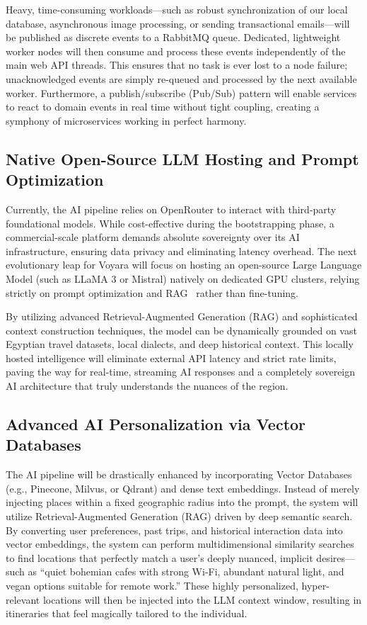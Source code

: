 Heavy, time-consuming workloads---such as robust synchronization of our local database, asynchronous image processing, or sending transactional emails---will be published as discrete events to a RabbitMQ queue. Dedicated, lightweight worker nodes will then consume and process these events independently of the main web API threads. This ensures that no task is ever lost to a node failure; unacknowledged events are simply re-queued and processed by the next available worker. Furthermore, a publish/subscribe (Pub/Sub) pattern will enable services to react to domain events in real time without tight coupling, creating a symphony of microservices working in perfect harmony.

\subsection{Native Open-Source LLM Hosting and Prompt Optimization}
Currently, the AI pipeline relies on OpenRouter to interact with third-party foundational models. While cost-effective during the bootstrapping phase, a commercial-scale platform demands absolute sovereignty over its AI infrastructure, ensuring data privacy and eliminating latency overhead. The next evolutionary leap for Voyara will focus on hosting an open-source Large Language Model (such as LLaMA 3 or Mistral) natively on dedicated GPU clusters, relying strictly on prompt optimization and RAG~\cite{lewis2020retrieval} rather than fine-tuning.

By utilizing advanced Retrieval-Augmented Generation (RAG) and sophisticated context construction techniques, the model can be dynamically grounded on vast Egyptian travel datasets, local dialects, and deep historical context. This locally hosted intelligence will eliminate external API latency and strict rate limits, paving the way for real-time, streaming AI responses and a completely sovereign AI architecture that truly understands the nuances of the region.

\subsection{Advanced AI Personalization via Vector Databases}
The AI pipeline will be drastically enhanced by incorporating Vector Databases (e.g., Pinecone, Milvus, or Qdrant) and dense text embeddings. Instead of merely injecting places within a fixed geographic radius into the prompt, the system will utilize Retrieval-Augmented Generation (RAG) driven by deep semantic search. By converting user preferences, past trips, and historical interaction data into vector embeddings, the system can perform multidimensional similarity searches to find locations that perfectly match a user's deeply nuanced, implicit desires---such as ``quiet bohemian cafes with strong Wi-Fi, abundant natural light, and vegan options suitable for remote work.'' These highly personalized, hyper-relevant locations will then be injected into the LLM context window, resulting in itineraries that feel magically tailored to the individual.

